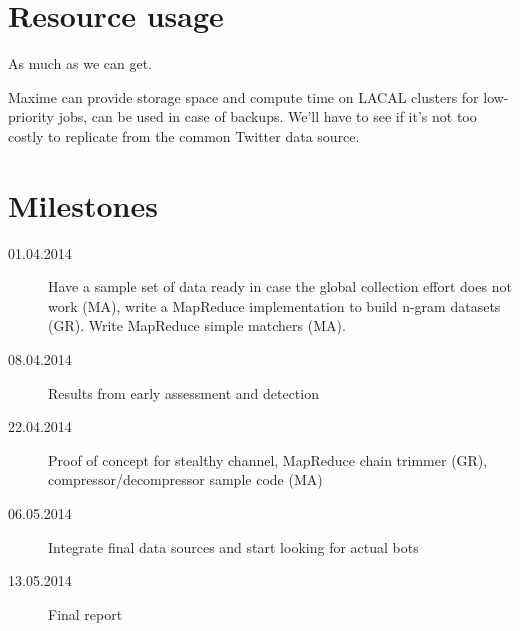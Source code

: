 \documentclass[a4paper,11pt]{article}
\begin{document}
\section{Resource usage}

As much as we can get.

Maxime can provide storage space and compute time on LACAL clusters for low-priority jobs, can be used in case of backups. We'll have to see if it's not too costly to replicate from the common Twitter data source.

\section{Milestones}

\begin{description}
	\item[01.04.2014] Have a sample set of data ready in case the global collection effort does not work (MA), write a MapReduce implementation to build n-gram datasets (GR). Write MapReduce simple matchers (MA).
	\item[08.04.2014] Results from early assessment and detection
	\item[22.04.2014] Proof of concept for stealthy channel, MapReduce chain trimmer (GR), compressor/decompressor sample code (MA)
	\item[06.05.2014] Integrate final data sources and start looking for actual bots
	\item[13.05.2014] Final report 
\end{description}
\end{document}
